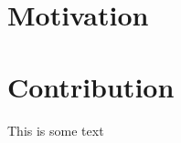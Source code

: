 \documentclass[../thesis.tex]{subfiles}
\begin{document}
\section{Motivation}


\section{Contribution}

This is some text
\end{document}
